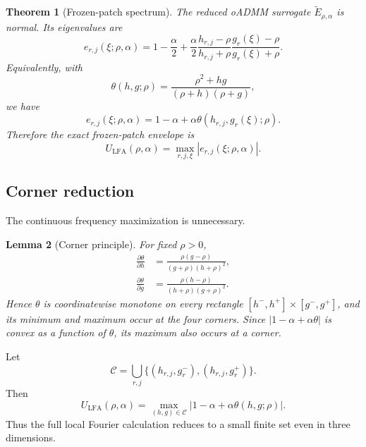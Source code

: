 \documentclass[11pt]{article}
\newtheorem{theorem}{Theorem}[section]
\newtheorem{lemma}[theorem]{Lemma}
\theoremstyle{definition}
\begin{document}
\begin{theorem}[Frozen-patch spectrum]\label{thm:frozen}
The reduced oADMM surrogate $\widetilde E_{\rho,\alpha}$ is normal. Its eigenvalues are
\begin{equation}
e_{r,j}(\xi;\rho,\alpha)
=1-\frac{\alpha}{2}
+\frac{\alpha}{2}
\frac{h_{r,j}-\rho}{h_{r,j}+\rho}
\frac{g_r(\xi)-\rho}{g_r(\xi)+\rho}.
\label{eq:local_eig}
\end{equation}
Equivalently, with
\begin{equation}
\theta(h,g;\rho)=\frac{\rho^2+hg}{(\rho+h)(\rho+g)},
\label{eq:theta}
\end{equation}
we have
\[
e_{r,j}(\xi;\rho,\alpha)
=1-\alpha+\alpha\theta(h_{r,j},g_r(\xi);\rho).
\]
Therefore the exact frozen-patch envelope is
\begin{equation}
U_{\mathrm{LFA}}(\rho,\alpha)
=\max_{r,j,\xi}|e_{r,j}(\xi;\rho,\alpha)|.
\label{eq:ULFA}
\end{equation}
\end{theorem}

\subsection{Corner reduction}
The continuous frequency maximization is unnecessary.

\begin{lemma}[Corner principle]\label{lem:corners}
For fixed $\rho>0$,
\begin{align}
\frac{\partial\theta}{\partial h}
&=\frac{\rho(g-\rho)}{(g+\rho)(h+\rho)^2},\\
\frac{\partial\theta}{\partial g}
&=\frac{\rho(h-\rho)}{(h+\rho)(g+\rho)^2}.
\end{align}
Hence $\theta$ is coordinatewise monotone on every rectangle
$[h^-,h^+]\times[g^-,g^+]$, and its minimum and maximum occur at the four corners. Since $|1-\alpha+\alpha\theta|$ is convex as a function of $\theta$, its maximum also occurs at a corner.
\end{lemma}

Let
\begin{equation}
\mathcal C=\bigcup_{r,j}
\{(h_{r,j},g_r^-),(h_{r,j},g_r^+)\}.
\label{eq:cornerset}
\end{equation}
Then
\begin{equation}
U_{\mathrm{LFA}}(\rho,\alpha)
=\max_{(h,g)\in\mathcal C}
|1-\alpha+\alpha\theta(h,g;\rho)|.
\label{eq:finite_envelope}
\end{equation}
Thus the full local Fourier calculation reduces to a small finite set even in three dimensions.
\end{document}
